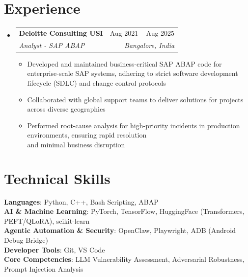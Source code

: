 \documentclass[letterpaper,11pt]{article}
\makeatletter
\newcommand{\resumeItem}[1]{
  \item\small{
    {#1 \vspace{-2pt}}
  }
}
\newcommand{\resumeSubheading}[4]{
  \vspace{-2pt}\item
    \begin{tabular*}{0.97\textwidth}[t]{l@{\extracolsep{\fill}}r}
      \textbf{#1} & #2 \\
      \textit{\small#3} & \textit{\small #4} \\
    \end{tabular*}\vspace{-7pt}
}
\newcommand{\resumeSubSubheading}[2]{
    \item
    \begin{tabular*}{0.97\textwidth}{l@{\extracolsep{\fill}}r}
      \textit{\small#1} & \textit{\small #2} \\
    \end{tabular*}\vspace{-7pt}
}
\newcommand{\resumeSubHeadingListStart}{\begin{itemize}[leftmargin=0.15in, label={}]}
\newcommand{\resumeSubHeadingListEnd}{\end{itemize}}
\newcommand{\resumeItemListStart}{\begin{itemize}}
\newcommand{\resumeItemListEnd}{\end{itemize}\vspace{-5pt}}
\makeatother
\begin{document}
\section{Experience}
  \resumeSubHeadingListStart

    \resumeSubheading
      {Deloitte Consulting USI}{Aug 2021 -- Aug 2025}
      {Analyst - SAP ABAP}{Bangalore, India}
      \resumeItemListStart
        \resumeItem{Developed and maintained business-critical SAP ABAP code for enterprise-scale SAP systems, adhering to strict software development lifecycle (SDLC) and change control protocols}
        \resumeItem{Collaborated with global support teams to deliver solutions for projects across diverse geographies}
        \resumeItem{Performed root-cause analysis for high-priority incidents in production environments, ensuring rapid resolution \\and minimal business disruption}
      \resumeItemListEnd
      

  
  \resumeSubHeadingListEnd
%
\section{Technical Skills}
 \begin{itemize}[leftmargin=0.15in, label={}]
    \small{\item{
     \textbf{Languages}{: Python, C++, Bash Scripting, ABAP} \\
     \textbf{AI \& Machine Learning}{: PyTorch, TensorFlow, HuggingFace (Transformers, PEFT/QLoRA), scikit-learn} \\
     \textbf{Agentic Automation \& Security}{: OpenClaw, Playwright, ADB (Android Debug Bridge)} \\
     \textbf{Developer Tools}{: Git, VS Code} \\
     \textbf{Core Competencies}{: LLM Vulnerability Assessment, Adversarial Robustness, Prompt Injection Analysis}
    }}
 \end{itemize}


\end{document}
